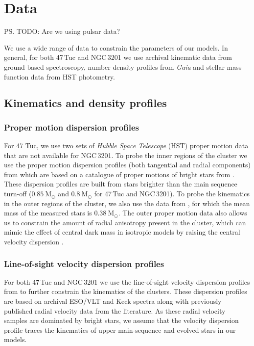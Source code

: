 \newcommand{\evolvemf}{\code{evolve\_mf}}



\section{Data}

\ps{TODO: Are we using pulsar data?}

We use a wide range of data to constrain the parameters of our models. In general, for both 47\,Tuc
and NGC\,3201 we use archival kinematic data from ground based spectroscopy, number density profiles from
\emph{Gaia} and stellar mass function data from HST photometry.

\subsection{Kinematics and density profiles}

\subsubsection{Proper motion dispersion profiles}

For 47 Tuc, we use two sets of {\it Hubble Space Telescope} (HST) proper motion data that are not
available for NGC\,3201. To probe the inner regions of the cluster we use the proper motion
dispersion profiles (both tangential and radial components) from \citet{Watkins2015} which are based
on a catalogue of proper motions of bright stars from \citet{Bellini2014}. These dispersion profiles
are built from stars brighter than the main sequence turn-off ($0.85 \ \mathrm{M}_\odot$ and $0.8 \
	\mathrm{M}_\odot$ for 47\,Tuc and NGC\,3201). To probe the kinematics in the outer regions of the
cluster, we also use the data from \citet{Heyl2017}, for which the mean mass of the measured stars
is $0.38 \ \mathrm{M}_{\odot}$. The outer proper motion data also allows us to constrain the amount
of radial anisotropy present in the cluster, which can mimic the effect of central dark mass in
isotropic models by raising the central velocity dispersion \citep{Zocchi2017}.


\subsubsection{Line-of-sight velocity dispersion profiles}

For both 47\,Tuc and NGC\,3201 we use the line-of-sight velocity dispersion profiles from
\citet{Baumgardt2018} to further constrain the kinematics of the clusters. These dispersion profiles
are based on archival ESO/VLT and Keck spectra along with previously published radial velocity data
from the literature. As these radial velocity samples are dominated by bright stars, we assume that
the velocity dispersion profile traces the kinematics of upper main-sequence and evolved stars in
our models.

